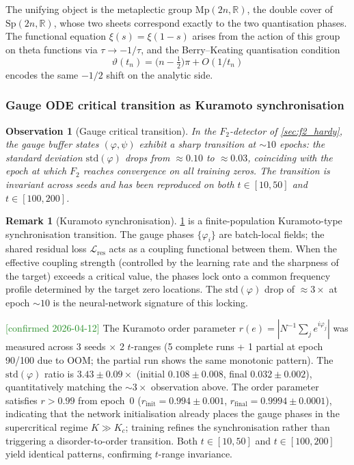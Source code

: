 \documentclass[11pt, a4paper]{article}
\theoremstyle{definition}
\newtheorem{remark}{Remark}[section]
\theoremstyle{plain}
\newtheorem{observation}[theorem]{Observation}
\newcommand{\xif}{\xi}                      %
\begin{document}
The unifying object is the metaplectic group
$\mathrm{Mp}(2n,\mathbb{R})$, the double cover of
$\mathrm{Sp}(2n,\mathbb{R})$, whose two sheets correspond exactly to
the two quantisation phases. The functional equation
$\xif(s)=\xif(1-s)$ arises from the action of this group on theta
functions via $\tau\to-1/\tau$, and the Berry--Keating quantisation
condition
\begin{equation}\label{eq:berry_keating}
  \vartheta(t_n)=\bigl(n-\tfrac12\bigr)\pi + O(1/t_n)
\end{equation}
encodes the same $-1/2$ shift on the analytic side.

\subsubsection{Gauge ODE critical transition as Kuramoto
  synchronisation}
\label{sec:kuramoto}

\begin{observation}[Gauge critical transition]
\label{obs:gauge_transition}
In the $F_2$-detector of \cref{sec:f2_hardy}, the gauge buffer
states $(\varphi,\psi)$ exhibit a sharp transition at
${\sim}10$ epochs: the standard deviation
$\mathrm{std}(\varphi)$ drops from $\approx 0.10$ to $\approx 0.03$,
coinciding with the epoch at which $F_2$ reaches convergence on all
training zeros. The transition is invariant across seeds and has
been reproduced on both $t\in[10,50]$ and $t\in[100,200]$.
\end{observation}

\begin{remark}[Kuramoto synchronisation]
\label{rem:kuramoto_transition}
\cref{obs:gauge_transition} is a finite-population
Kuramoto-type synchronisation transition. The gauge phases
$\{\varphi_i\}$ are batch-local fields; the shared residual loss
$\mathcal{L}_{\mathrm{res}}$ acts as a coupling functional between
them. When the effective coupling strength (controlled by the
learning rate and the sharpness of the target) exceeds a critical
value, the phases lock onto a common frequency profile determined
by the target zero locations. The $\mathrm{std}(\varphi)$ drop of
$\approx 3\times$ at epoch $\sim 10$ is the neural-network
signature of this locking.

\textcolor{ForestGreen}{[confirmed 2026-04-12]}
The Kuramoto order parameter $r(e)=|N^{-1}\sum_j e^{i\varphi_j}|$
was measured across 3 seeds $\times$ 2 $t$-ranges
(5 complete runs + 1 partial at epoch 90/100 due to OOM; the
partial run shows the same monotonic pattern).
The $\mathrm{std}(\varphi)$ ratio is $3.43\pm0.09\times$
(initial $0.108\pm0.008$, final $0.032\pm0.002$), quantitatively
matching the ${\sim}3\times$ observation above.
The order parameter satisfies $r>0.99$ from epoch~$0$
($r_{\mathrm{init}}=0.994\pm0.001$, $r_{\mathrm{final}}=0.9994\pm0.0001$),
indicating that the network initialisation already places the gauge
phases in the supercritical regime $K\gg K_c$; training refines
the synchronisation rather than triggering a disorder-to-order transition.
Both $t\in[10,50]$ and $t\in[100,200]$ yield identical patterns,
confirming $t$-range invariance.
\end{remark}
\end{document}
